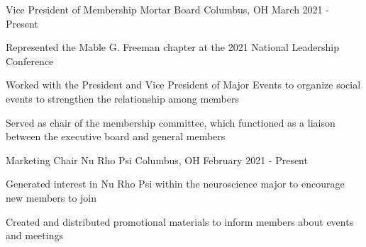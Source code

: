 

\begin{cventries}

  \cventry
    {Vice President of Membership} %
    {Mortar Board} %
    {Columbus, OH} %
    {March 2021 - Present} %
    {
      \begin{cvitems} %
        \item {Represented the Mable G. Freeman chapter at the 2021 National Leadership Conference}
        \item {Worked with the President and Vice President of Major Events to organize social events to strengthen the relationship among members}
        \item {Served as chair of the membership committee, which functioned as a liaison between the executive board and general members}
      \end{cvitems}
    }

  \cventry
    {Marketing Chair} %
    {Nu Rho Psi} %
    {Columbus, OH} %
    {February 2021 - Present} %
    {
      \begin{cvitems} %
        \item {Generated interest in Nu Rho Psi within the neuroscience major to encourage new members to join}
        \item {Created and distributed promotional materials to inform members about events and meetings}
      \end{cvitems}
    }

\end{cventries}